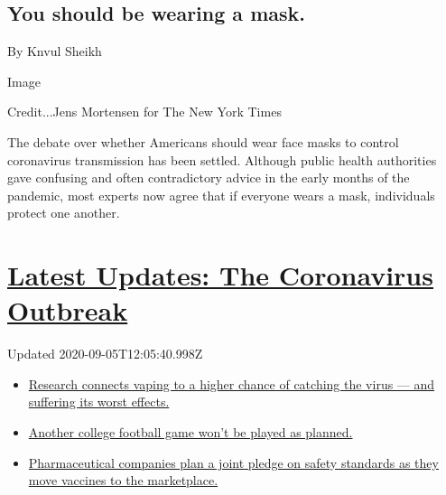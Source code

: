 \hypertarget{you-should-be-wearing-a-mask}{%
\subsection{You should be wearing a
mask.}\label{you-should-be-wearing-a-mask}}

By Knvul Sheikh

Image

Credit...Jens Mortensen for The New York Times

The debate over whether Americans should wear face masks to control
coronavirus transmission has been settled. Although public health
authorities gave confusing and often contradictory advice in the early
months of the pandemic, most experts now agree that if everyone wears a
mask, individuals protect one another.

\hypertarget{latest-updates-the-coronavirus-outbreak}{%
\section{\texorpdfstring{\href{https://www.nytimes3xbfgragh.onion/2020/09/04/world/covid-19-coronavirus.html?action=click\&pgtype=Article\&state=default\&region=MAIN_CONTENT_1\&context=storylines_live_updates}{Latest
Updates: The Coronavirus
Outbreak}}{Latest Updates: The Coronavirus Outbreak}}\label{latest-updates-the-coronavirus-outbreak}}

Updated 2020-09-05T12:05:40.998Z

\begin{itemize}
\tightlist
\item
  \href{https://www.nytimes3xbfgragh.onion/2020/09/04/world/covid-19-coronavirus.html?action=click\&pgtype=Article\&state=default\&region=MAIN_CONTENT_1\&context=storylines_live_updates\#link-1654f6ad}{Research
  connects vaping to a higher chance of catching the virus --- and
  suffering its worst effects.}
\item
  \href{https://www.nytimes3xbfgragh.onion/2020/09/04/world/covid-19-coronavirus.html?action=click\&pgtype=Article\&state=default\&region=MAIN_CONTENT_1\&context=storylines_live_updates\#link-52e4198a}{Another
  college football game won't be played as planned.}
\item
  \href{https://www.nytimes3xbfgragh.onion/2020/09/04/world/covid-19-coronavirus.html?action=click\&pgtype=Article\&state=default\&region=MAIN_CONTENT_1\&context=storylines_live_updates\#link-181cef0}{Pharmaceutical
  companies plan a joint pledge on safety standards as they move
  vaccines to the marketplace.}
\end{itemize}

